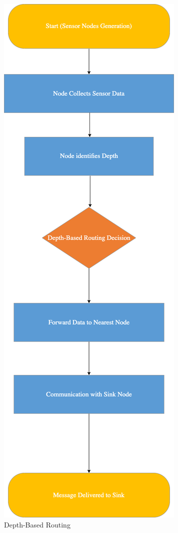 \documentclass[]{nsm-thesis}
\begin{document}
\begin{figure}[h]
\graphicspath{{/image/}} %
\centering
\includegraphics[scale=0.4]{image/Untitled Diagram.drawio (1).png} %
\caption{Depth-Based Routing\cite{10.1007/978-3-540-79549-0_7}}
\label{fig:mesh2} %
\end{figure}
\clearpage
\end{document}

